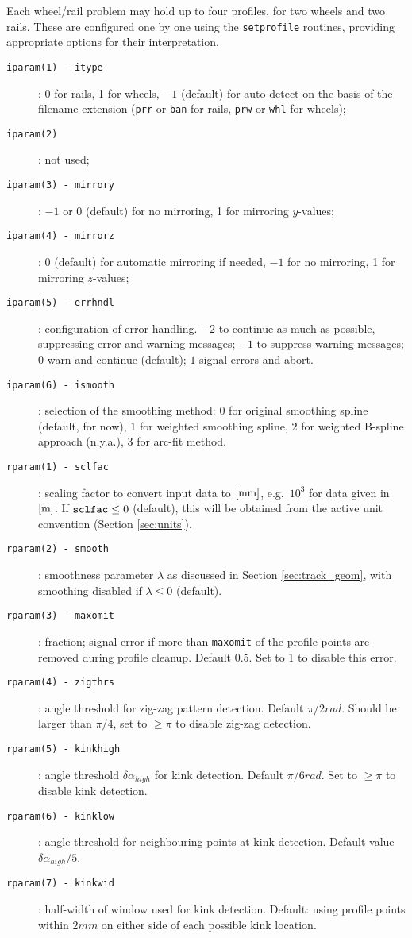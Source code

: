 \documentclass[12pt]{report}
\begin{document}
Each wheel/rail problem may hold up to four profiles, for two wheels and
two rails. These are configured one by one using the {\tt setprofile}
routines, providing appropriate options for their interpretation.
\begin{description}
\item[\tt iparam(1) - itype]: 0 for rails, 1 for wheels, $-1$ (default)
        for auto-detect on the basis of the filename extension ({\tt prr}
        or {\tt ban} for rails, {\tt prw} or {\tt whl} for wheels);
\item[\tt iparam(2)]: not used;
\item[\tt iparam(3) - mirrory]: $-1$ or 0 (default) for no mirroring, 
        1 for mirroring $y$-values;
\item[\tt iparam(4) - mirrorz]: 0 (default) for automatic mirroring if
        needed, $-1$ for no mirroring, 1 for mirroring $z$-values;
\item[\tt iparam(5) - errhndl]: configuration of error handling.
        $-2$ to continue as much as possible, suppressing error and warning
        messages; $-1$ to suppress warning messages; $0$ warn and continue
        (default); $1$ signal errors and abort.
\item[\tt iparam(6) - ismooth]: selection of the smoothing
        method: $0$ for original smoothing spline (default, for now), $1$
        for weighted smoothing spline, $2$ for weighted B-spline approach
        (n.y.a.), $3$ for arc-fit method.
\item[\tt rparam(1) - sclfac]: scaling factor to convert input data
        to $[\mathrm{mm}]$, e.g.\ $10^3$ for data given in $[\mathrm{m}]$. If ${\tt
        sclfac}\le 0$ (default), this will be obtained from the active unit
        convention (Section \ref{sec:units}).
\item[\tt rparam(2) - smooth]: smoothness parameter $\lambda$ as
        discussed in Section \ref{sec:track_geom}, with smoothing disabled
        if $\lambda\le 0$ (default).
\item[\tt rparam(3) - maxomit]: fraction; signal error if more
        than {\tt maxomit} of the profile points are removed during
        profile cleanup. Default $0.5$. Set to 1 to disable this error.
\item[\tt rparam(4) - zigthrs]: angle threshold for zig-zag pattern
        detection. Default $\pi/2\unit{rad}$. Should be larger than
        $\pi/4$, set to $\ge\pi$ to disable zig-zag detection.
\item[\tt rparam(5) - kinkhigh]: angle threshold $\delta\alpha_{high}$ for
        kink detection. Default $\pi/6\unit{rad}$. Set to $\ge\pi$ to disable
        kink detection.
\item[\tt rparam(6) - kinklow]: angle threshold for neighbouring points at
        kink detection. Default value $\delta\alpha_{high}/5$.
\item[\tt rparam(7) - kinkwid]: half-width of window used for kink detection.
        Default: using profile points within $2\unit{mm}$ on either side of
        each possible kink location.
\end{description}
\end{document}
